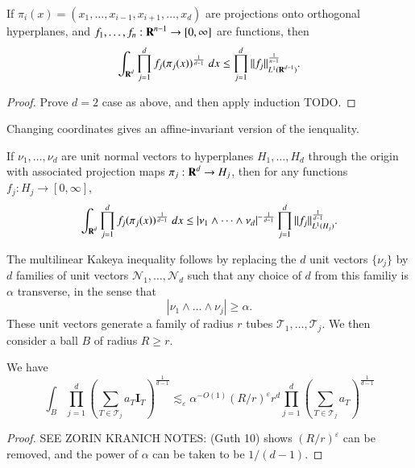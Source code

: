 \begin{theorem}
  If $\pi_i(x) = (x_1,\dots,x_{i-1},x_{i+1},\dots,x_d)$ are projections onto orthogonal hyperplanes, and $f_1,\dots,f_n: \operatorname{\mathbf{R}}^{n-1} \to [0,\infty]$ are functions, then
  \[ \int_{\operatorname{\mathbf{R}}^d} \prod_{j = 1}^d f_j(\pi_j(x))^{\frac{1}{d-1}}\; dx \leq \prod_{j = 1}^d \| f_j \|_{L^1(\operatorname{\mathbf{R}}^{d-1})}^{\frac{1}{n-1}}. \]
\end{theorem}
\begin{proof}
  Prove $d = 2$ case as above, and then apply induction TODO.
\end{proof}

Changing coordinates gives an affine-invariant version of the ienquality.

\begin{theorem}
  If $\nu_1,\dots,\nu_d$ are unit normal vectors to hyperplanes $H_1,\dots,H_d$ through the origin with associated projection maps $\pi_j: \operatorname{\mathbf{R}}^d \to H_j$, then for any functions $f_j: H_j \to [0,\infty]$,
  \[ \int_{\operatorname{\mathbf{R}}^d} \prod_{j = 1}^d f_j(\pi_j(x))^{\frac{1}{d-1}}\; dx \leq |\nu_1 \wedge \dots \wedge \nu_d|^{- \frac{1}{d-1}} \prod_{j = 1}^d \| f_j \|_{L^1(H_j)}^{\frac{1}{d-1}}. \]
\end{theorem}

The multilinear Kakeya inequality follows by replacing the $d$ unit vectors $\{ \nu_j \}$ by $d$ families of unit vectors $\mathcal{N}_1, \dots, \mathcal{N}_d$ such that any choice of $d$ from this familiy is $\alpha$ transverse, in the sense that
%
\[ |\nu_1 \wedge \dots \wedge \nu_j| \geq \alpha. \]
%
These unit vectors generate a family of radius $r$ tubes $\mathcal{T}_1, \dots, \mathcal{T}_j$. We then consider a ball $B$ of radius $R \geq r$.

\begin{theorem}
  We have
  \[ \int_B \prod_{j = 1}^d \left( \sum_{T \in \mathcal{T}_j} a_T \mathbf{I}_T \right)^{\frac{1}{d-1}} \lesssim_\varepsilon \alpha^{-O(1)} (R/r)^{\varepsilon} r^d \prod_{j = 1}^d \left( \sum_{T \in \mathcal{T}_j} a_T \right)^{\frac{1}{d-1}} \]
\end{theorem}
\begin{proof}
  SEE ZORIN KRANICH NOTES: (Guth 10) shows $(R/r)^\varepsilon$ can be removed, and the power of $\alpha$ can be taken to be $1/(d-1)$.
\end{proof}




